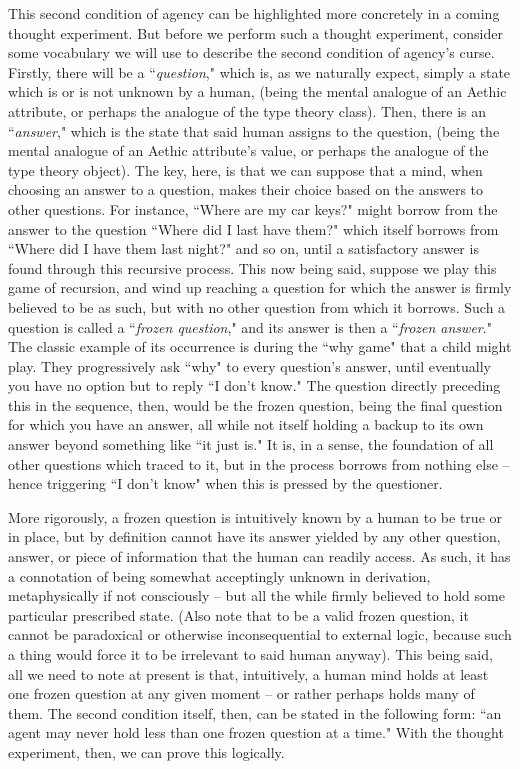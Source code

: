 This second condition of agency can be highlighted more concretely in a coming thought experiment. But before we perform such a thought experiment, consider some vocabulary we will use to describe the second condition of agency's curse. Firstly, there will be a ``\textit{question}," which is, as we naturally expect, simply a state which is or is not unknown by a human, (being the mental analogue of an Aethic attribute, or perhaps the analogue of the type theory class). Then, there is an ``\textit{answer}," which is the state that said human assigns to the question, (being the mental analogue of an Aethic attribute's value, or perhaps the analogue of the type theory object). The key, here, is that we can suppose that a mind, when choosing an answer to a question, makes their choice based on the answers to other questions. For instance, ``Where are my car keys?" might borrow from the answer to the question ``Where did I last have them?" which itself borrows from ``Where did I have them last night?" and so on, until a satisfactory answer is found through this recursive process. This now being said, suppose we play this game of recursion, and wind up reaching a question for which the answer is firmly believed to be as such, but with no other question from which it borrows. Such a question is called a ``\textit{frozen question}," and its answer is then a ``\textit{frozen answer}." The classic example of its occurrence is during the ``why game" that a child might play. They progressively ask ``why" to every question's answer, until eventually you have no option but to reply ``I don't know." The question directly preceding this in the sequence, then, would be the frozen question, being the final question for which you have an answer, all while not itself holding a backup to its own answer beyond something like ``it just is." It is, in a sense, the foundation of all other questions which traced to it, but in the process borrows from nothing else -- hence triggering ``I don't know" when this is pressed by the questioner. 

More rigorously, a frozen question is intuitively known by a human to be true or in place, but by definition cannot have its answer yielded by any other question, answer, or piece of information that the human can readily access. As such, it has a connotation of being somewhat acceptingly unknown in derivation, metaphysically if not consciously -- but all the while firmly believed to hold some particular prescribed state. (Also note that to be a valid frozen question, it cannot be paradoxical or otherwise inconsequential to external logic, because such a thing would force it to be irrelevant to said human anyway). This being said, all we need to note at present is that, intuitively, a human mind holds at least one frozen question at any given moment -- or rather perhaps holds many of them. The second condition itself, then, can be stated in the following form: ``an agent may never hold less than one frozen question at a time." With the thought experiment, then, we can prove this logically. 

